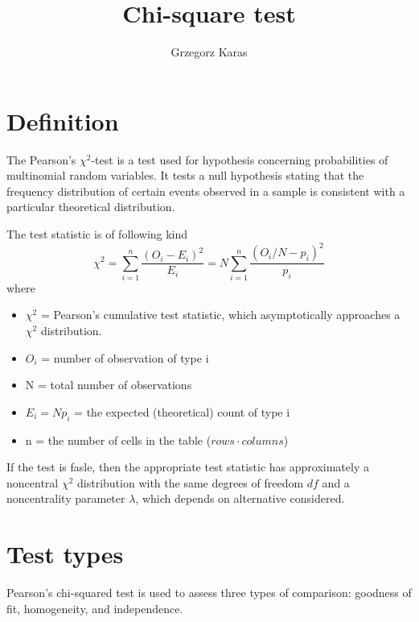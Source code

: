\documentclass{article}
\title{Chi-square test}
\author{Grzegorz Karas}
\begin{document}
\maketitle


\section{Definition \cite{wiki, paper}}
The Pearson's $\chi^2$-test is a test used for hypothesis concerning 
probabilities of multinomial random variables. It tests a null hypothesis stating that the frequency distribution of certain 
events observed in a sample is consistent with a particular theoretical distribution.

The test statistic is of following kind
\begin{equation}
    \chi^2=\sum_{i=1}^n \frac{\left(O_i-E_i\right)^2}{E_i} = N \sum_{i=1}^n \frac{\left(O_i/N-p_i\right)^2}{p_i}
\end{equation}
where
\begin{itemize}
    \item $\chi^2$ = Pearson's cumulative test statistic, which asymptotically approaches a $\chi^2$ distribution.
    \item $O_i$ = number of observation of type i
    \item N = total number of observations
    \item $E_i = Np_i$ = the expected (theoretical) count of type i
    \item n = the number of cells in the table ($rows\cdot columns$)
\end{itemize}

If the test is fasle, then the appropriate test statistic has approximately 
a noncentral $\chi^2$ distribution with the same degrees of freedom $df$ and
a noncentrality parameter $\lambda$, which depends on alternative considered.

\section{Test types \cite{wiki}}
Pearson's chi-squared test is used to assess three types of comparison: 
goodness of fit, homogeneity, and independence.
\end{document}
